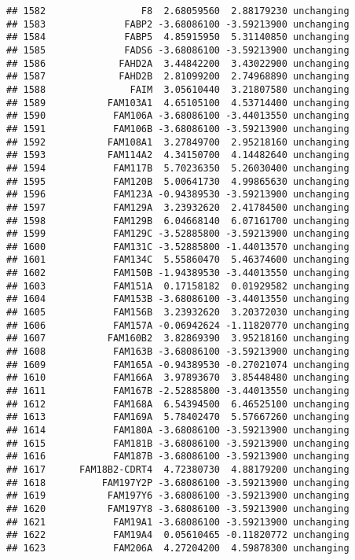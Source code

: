 \documentclass[]{article}
\begin{document}
\begin{verbatim}
## 1582                 F8  2.68059560  2.88179230 unchanging
## 1583              FABP2 -3.68086100 -3.59213900 unchanging
## 1584              FABP5  4.85915950  5.31140850 unchanging
## 1585              FADS6 -3.68086100 -3.59213900 unchanging
## 1586             FAHD2A  3.44842200  3.43022900 unchanging
## 1587             FAHD2B  2.81099200  2.74968890 unchanging
## 1588               FAIM  3.05610440  3.21807580 unchanging
## 1589           FAM103A1  4.65105100  4.53714400 unchanging
## 1590            FAM106A -3.68086100 -3.44013550 unchanging
## 1591            FAM106B -3.68086100 -3.59213900 unchanging
## 1592           FAM108A1  3.27849700  2.95218160 unchanging
## 1593           FAM114A2  4.34150700  4.14482640 unchanging
## 1594            FAM117B  5.70236350  5.26030400 unchanging
## 1595            FAM120B  5.00641730  4.99865630 unchanging
## 1596            FAM123A -0.94389530 -3.59213900 unchanging
## 1597            FAM129A  3.23932620  2.41784500 unchanging
## 1598            FAM129B  6.04668140  6.07161700 unchanging
## 1599            FAM129C -3.52885800 -3.59213900 unchanging
## 1600            FAM131C -3.52885800 -1.44013570 unchanging
## 1601            FAM134C  5.55860470  5.46374600 unchanging
## 1602            FAM150B -1.94389530 -3.44013550 unchanging
## 1603            FAM151A  0.17158182  0.01929582 unchanging
## 1604            FAM153B -3.68086100 -3.44013550 unchanging
## 1605            FAM156B  3.23932620  3.20372030 unchanging
## 1606            FAM157A -0.06942624 -1.11820770 unchanging
## 1607           FAM160B2  3.82869390  3.95218160 unchanging
## 1608            FAM163B -3.68086100 -3.59213900 unchanging
## 1609            FAM165A -0.94389530 -0.27021074 unchanging
## 1610            FAM166A  3.97893670  3.85448480 unchanging
## 1611            FAM167B -2.52885800 -3.44013550 unchanging
## 1612            FAM168A  6.54394500  6.46525100 unchanging
## 1613            FAM169A  5.78402470  5.57667260 unchanging
## 1614            FAM180A -3.68086100 -3.59213900 unchanging
## 1615            FAM181B -3.68086100 -3.59213900 unchanging
## 1616            FAM187B -3.68086100 -3.59213900 unchanging
## 1617      FAM18B2-CDRT4  4.72380730  4.88179200 unchanging
## 1618          FAM197Y2P -3.68086100 -3.59213900 unchanging
## 1619           FAM197Y6 -3.68086100 -3.59213900 unchanging
## 1620           FAM197Y8 -3.68086100 -3.59213900 unchanging
## 1621            FAM19A1 -3.68086100 -3.59213900 unchanging
## 1622            FAM19A4  0.05610465 -0.11820772 unchanging
## 1623            FAM206A  4.27204200  4.59878300 unchanging

\end{verbatim}
\end{document}
